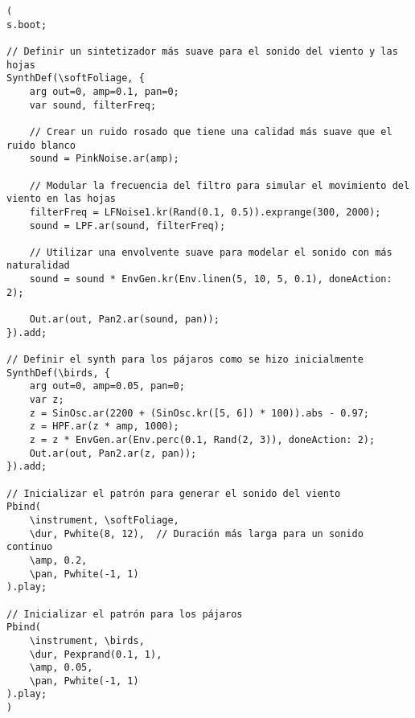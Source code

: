 \begin{minipage}[t]{1\textwidth}
    \centering
    \begin{lstlisting}[style=SuperCollider-IDE, basicstyle=\footnotesize\ttfamily, numbers=none]
(
s.boot;

// Definir un sintetizador más suave para el sonido del viento y las hojas
SynthDef(\softFoliage, {
    arg out=0, amp=0.1, pan=0;
    var sound, filterFreq;

    // Crear un ruido rosado que tiene una calidad más suave que el ruido blanco
    sound = PinkNoise.ar(amp);

    // Modular la frecuencia del filtro para simular el movimiento del viento en las hojas
    filterFreq = LFNoise1.kr(Rand(0.1, 0.5)).exprange(300, 2000);
    sound = LPF.ar(sound, filterFreq);

    // Utilizar una envolvente suave para modelar el sonido con más naturalidad
    sound = sound * EnvGen.kr(Env.linen(5, 10, 5, 0.1), doneAction: 2);

    Out.ar(out, Pan2.ar(sound, pan));
}).add;

// Definir el synth para los pájaros como se hizo inicialmente
SynthDef(\birds, {
    arg out=0, amp=0.05, pan=0;
    var z;
    z = SinOsc.ar(2200 + (SinOsc.kr([5, 6]) * 100)).abs - 0.97;
    z = HPF.ar(z * amp, 1000);
    z = z * EnvGen.ar(Env.perc(0.1, Rand(2, 3)), doneAction: 2);
    Out.ar(out, Pan2.ar(z, pan));
}).add;

// Inicializar el patrón para generar el sonido del viento
Pbind(
    \instrument, \softFoliage,
    \dur, Pwhite(8, 12),  // Duración más larga para un sonido continuo
    \amp, 0.2,
    \pan, Pwhite(-1, 1)
).play;

// Inicializar el patrón para los pájaros
Pbind(
    \instrument, \birds,
    \dur, Pexprand(0.1, 1),
    \amp, 0.05,
    \pan, Pwhite(-1, 1)
).play;
)                                    
    \end{lstlisting}
    \vspace{1cm}
\end{minipage}
















